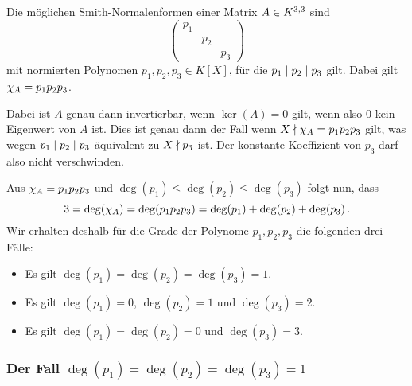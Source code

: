 \section{}





\subsection{}

Die möglichen Smith-Normalenformen einer Matrix $A \in \matrices{3}{K}$ sind
\[
  \begin{pmatrix}
    p_1 &     &     \\
        & p_2 &     \\
        &     & p_3
  \end{pmatrix}
\]
mit normierten Polynomen $p_1, p_2, p_3 \in K[X]$, für die $p_1 \divides p_2 \divides p_3$ gilt.
Dabei gilt $\charpol{A} = p_1 p_2 p_3$.

Dabei ist $A$ genau dann invertierbar, wenn $\ker(A) = 0$ gilt, wenn also $0$ kein Eigenwert von $A$ ist.
Dies ist genau dann der Fall wenn $X \notdivides \charpol{A} = p_1 p_2 p_3$ gilt, was wegen $p_1 \divides p_2 \divides p_3$ äquivalent zu $X \notdivides p_3$ ist.
Der konstante Koeffizient von $p_3$ darf also nicht verschwinden.

Aus $\charpol{A} = p_1 p_2 p_3$ und $\deg(p_1) \leq \deg(p_2) \leq \deg(p_3)$ folgt nun, dass
\[
    3
  = \deg(\charpol{A})
  = \deg(p_1 p_2 p_3)
  = \deg(p_1) + \deg(p_2) + \deg(p_3) \,.
\]
Wir erhalten deshalb für die Grade der Polynome $p_1, p_2, p_3$ die folgenden drei Fälle:
\begin{itemize}
  \item
    Es gilt $\deg(p_1) = \deg(p_2) = \deg(p_3) = 1$.
  \item
    Es gilt $\deg(p_1) = 0$, $\deg(p_2) = 1$ und $\deg(p_3) = 2$.
  \item
    Es gilt $\deg(p_1) = \deg(p_2) = 0$ und $\deg(p_3) = 3$.
\end{itemize}



\subsubsection*{Der Fall $\deg(p_1) = \deg(p_2) = \deg(p_3) = 1$}

